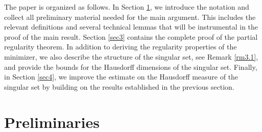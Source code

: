 \documentclass[a4paper]{amsart}
\theoremstyle{plain}  %
\numberwithin{equation}{section}
\begin{document}
\noindent The paper is organized as follows. In Section \ref{sec2}, we introduce the notation and collect all preliminary material needed for the main argument. This includes the relevant definitions and several technical lemmas that will be instrumental in the proof of the main result. Section \ref{sec3} contains the complete proof of the partial regularity theorem. In addition to deriving the regularity properties of the minimizer, we also describe the structure of the singular set, see Remark \ref{rm3.1}, and provide the bounds for the Hausdorff dimensions of the singular set. Finally, in Section \ref{sec4}, we improve the estimate on the Hausdorff measure of the singular set by building on the results established in the previous section.


\section{Preliminaries} \label{sec2}
\end{document}
